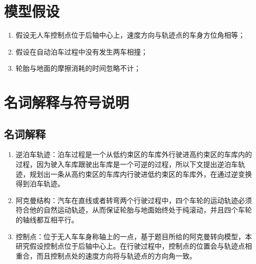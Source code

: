 \documentclass{MathorCupmodeling}
\begin{document}
	\section{模型假设}
	\begin{enumerate}
		\item 假设无人车控制点位于后轴中心上，速度方向与轨迹点的车身方位角相等；
		\item 假设在自动泊车过程中没有发生两车相撞；
		\item 轮胎与地面的摩擦消耗的时间忽略不计；
	\end{enumerate}
	
	\section{名词解释与符号说明}
	\subsection{名词解释}
	\begin{enumerate}
		\item 逆泊车轨迹：泊车过程是一个从低约束区的车库外行驶进高约束区的车库内的过程，因为驶入车库跟驶出车库是一个可逆的过程，所以下文提出逆泊车轨迹，规划出一条从高约束区的车库内行驶进低约束区的车库外，在通过逆变换得到泊车轨迹。
		\item 阿克曼结构：汽车在直线或者转弯两个行驶过程中，四个车轮的运动轨迹必须符合他的自然运动轨迹，从而保证轮胎与地面始终处于纯滚动，并且四个车轮的轴线都互相平行。
		\item 控制点：位于无人车车身称轴上的一点，基于题目所给的阿克曼转向模型，本研究假设控制点位于后轴中心上。在行驶过程中，控制点的位置会与轨迹点相重合，而且控制点处的速度方向将与轨迹点的方向角一致。
		
	\end{enumerate}
\end{document}
